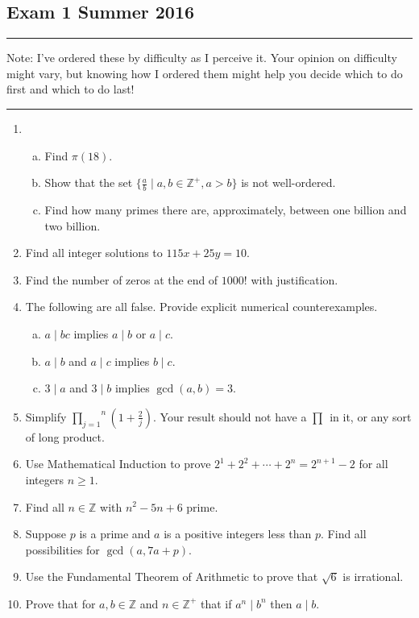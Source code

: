 \documentclass[class=article, crop=false]{standalone}
\def\integers{{\mathbb Z}}
\def\inlineprod#1#2{\overset{#2}{\underset{#1}{\prod}}}
\begin{document}
\subsection{Exam 1 Summer 2016}
\rule{\textwidth}{1pt}
Note: I've ordered these by difficulty as I perceive it. Your opinion on difficulty might vary,
but knowing how I ordered them might help you decide which to do first and which to do last!\\
\rule{\textwidth}{1pt}
\begin{enumerate}[1.]
	\item 
	\begin{enumerate}[(a)]
		\item Find $\pi(18)$.
		
		\item Show that the set $\{\frac{a}{b} \mid a,b\in\integers^+, a>b\}$ is not well-ordered.
		
		\item Find how many primes there are, approximately, between one billion and two billion.
	
	\end{enumerate}

	\item Find all integer solutions to $115x+25y=10$.
	
	\item Find the number of zeros at the end of $1000!$ with justification.
	
	\item The following are all false. Provide explicit numerical counterexamples.
	\begin{enumerate}[(a)]
		\item $a\mid bc$ implies $a\mid b$ or $a\mid c$.
		
		\item $a\mid b$ and $a\mid c$ implies $b\mid c$.
		
		\item $3\mid a$ and $3\mid b$ implies $\gcd(a,b)=3$.
	
	\end{enumerate}

	\item Simplify $\inlineprod{j=1}{n} \left(1+\frac{2}{j}\right)$. Your result should not have a 
	$\inlineprod{}{}$ in it, or any sort of long product.

	\item Use Mathematical Induction to prove $2^1+2^2+\cdots+2^n=2^{n+1}-2$ for all integers $n\geq 1$.
	
	\item Find all $n\in\integers$ with $n^2-5n+6$ prime.
	
	\item Suppose $p$ is a prime and $a$ is a positive integers less than $p$. Find all possibilities for
	$\gcd(a,7a+p)$.

	\item Use the Fundamental Theorem of Arithmetic to prove that $\sqrt{6}$ is irrational.
	
	\item Prove that for $a,b\in\integers$ and $n\in\integers^+$ that if $a^n\mid b^n$ then $a\mid b$.
	
\end{enumerate}
\end{document}
